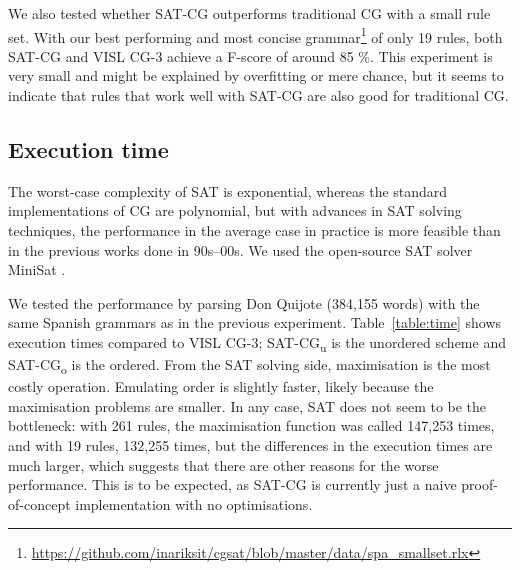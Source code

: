 We also tested whether SAT-CG outperforms traditional CG with a
small rule set. With our best performing and most concise
grammar\footnote{\url{https://github.com/inariksit/cgsat/blob/master/data/spa\_smallset.rlx}}
of only 19 rules, both SAT-CG and VISL CG-3  achieve a F-score of
around 85 \%. This experiment is very small and might be explained by
overfitting or mere chance, but it seems to indicate that rules that
work well with SAT-CG are also good for traditional CG.





\subsection{Execution time}

The worst-case complexity of SAT is exponential, whereas the standard
implementations of CG are polynomial, but with advances in SAT solving
techniques, the performance in the average case in practice is more feasible than in the previous works done in 90s--00s.
We used the open-source SAT solver MiniSat \cite{een04sat}.


We tested the performance by parsing Don Quijote (384,155 words) with
the same Spanish grammars as in the previous experiment. 
Table~\ref{table:time} shows execution times compared to VISL CG-3;
SAT-CG\textsubscript{u} is the unordered scheme and
SAT-CG\textsubscript{o} is the ordered.
From the SAT solving side, maximisation is the most costly operation. 
Emulating order is slightly faster, likely because the maximisation problems are smaller.
In any case, SAT does not seem to be the bottleneck: with 261 rules,
the maximisation function was called 147,253 times, and with 19 rules,
132,255 times, but 
the differences in the execution times are much larger, which suggests
that there are other reasons for the worse performance. 
This is to be expected, as SAT-CG is currently just a naive
proof-of-concept implementation with no optimisations.

